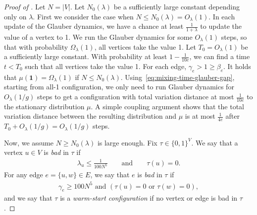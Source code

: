\documentclass[11pt]{amsart}
\theoremstyle{definition}
\theoremstyle{remark}
\begin{document}
\begin{proof}[Proof of ]
Let $N = |V|$. 
Let $N_0(\lambda)$ be a sufficiently large constant depending only on $\lambda$. First we consider the case when $N \leq N_0(\lambda) =  O_\lambda(1)$.
In each update of the Glauber dynamics, we have a chance at least $\frac{1}{1+\lambda}$ to update the value of a vertex to 1. 
We run the Glauber dynamics for some $O_\lambda(1)$ steps, so that with probability $\Omega_\lambda(1)$, all vertices take the value 1. 
Let $T_0 = O_\lambda(1)$ be a sufficiently large constant. With probability at least $1 - \frac{1}{10e}$, we can find a time $t < T_0$ such that all vertices take the value 1.
For each edge, $\gamma_e > 1 \geq \beta_e$. It holds that $\mu(\boldsymbol{1}) = \Omega_\lambda(1)$ if $N \leq N_0(\lambda)$. Using~\eqref{eq:mixing-time-glauber-gap}, starting from all-1 configuration, we only need to run Glauber dynamics for $O_\lambda(1/g)$ steps to get a configuration with total variation distance at most $\frac{1}{10e}$ to the stationary distribution $\mu$. 
A simple coupling argument shows that the total variation distance between the resulting distribution and $\mu$ is at most $\frac{1}{4e}$ after $T_0 + O_\lambda(1/g) = O_\lambda(1/g)$ steps.

Now, we assume $N \geq N_0(\lambda)$ is large enough.
Fix $\tau \in \{0,1\}^V$.
We say that a vertex $u \in V$ is \emph{bad} in $\tau$ if
\begin{align*}
    \lambda_u \leq \frac{1}{100 N^5}
    \qquad\text{and}\qquad
    \tau(u) = 0.
\end{align*}
For any edge $e = \{u,w\} \in E$, we say that $e$ is \emph{bad} in $\tau$ if
\begin{align*}
\gamma_e \geq 100N^5 \text{ and } (\tau(u) = 0 \text{ or } \tau(w) = 0),
\end{align*}
and we say that $\tau$ is a \emph{warm-start configuration} if no vertex or edge is bad in $\tau$.


\end{proof}
\end{document}
